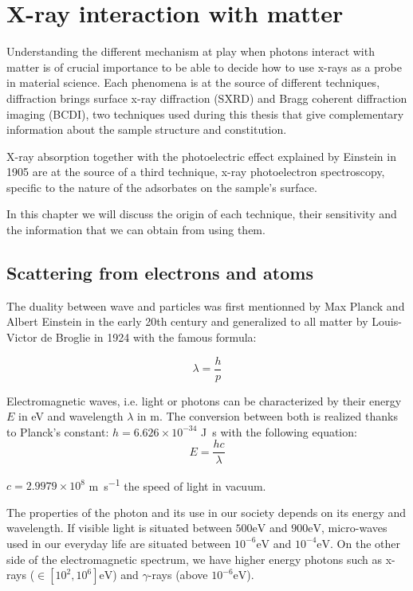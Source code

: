\section{X-ray interaction with matter}

Understanding the different mechanism at play when photons interact with matter is of crucial importance to be able to decide how to use x-rays as a probe in material science.
Each phenomena is at the source of different techniques, diffraction brings surface x-ray diffraction (SXRD) and Bragg coherent diffraction imaging (BCDI), two techniques used during this thesis that give complementary information about the sample structure and constitution.

X-ray absorption together with the photoelectric effect explained by Einstein in 1905 are at the source of a third technique, x-ray photoelectron spectroscopy, specific to the nature of the adsorbates on the sample's surface.

In this chapter we will discuss the origin of each technique, their sensitivity and the information that we can obtain from using them.

\subsection{Scattering from electrons and atoms}

The duality between wave and particles was first mentionned by Max Planck and Albert Einstein in the early 20th century and generalized to all matter by Louis-Victor de Broglie in 1924 with the famous formula:

\begin{equation}
	\lambda = \frac{h}{p}
\end{equation}

Electromagnetic waves, i.e. light or photons can be characterized by their energy $E$ in \si{\electronvolt} and wavelength $\lambda$ in \si{\meter}.
The conversion between both is realized thanks to Planck's constant: $h = 6.626 \times 10^{-34}$ \si{\joule \second} with the following equation:
\begin{equation}
	E = \frac{hc}{\lambda}
\end{equation}

$c = 2.9979 \times 10^{8}$ \si{\meter \per \second} the speed of light in vacuum.

The properties of the photon and its use in our society depends on its energy and wavelength. If visible light is situated between $500 \si{\electronvolt}$ and $900 \si{\electronvolt}$, micro-waves used in our everyday life are situated between $10^{-6} \si{\electronvolt}$ and $10^{-4}\si{\electronvolt}$. On the other side of the electromagnetic spectrum, we have higher energy photons such as x-rays ($\in [10^{2}, 10^{6}] \si{\electronvolt}$) and $\gamma$-rays (above $10^{-6} \si{\electronvolt}$).

